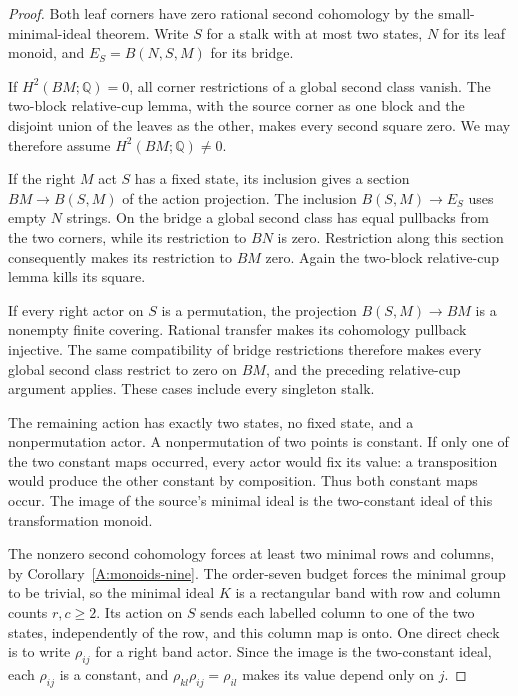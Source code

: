 \begin{proof}
Both leaf corners have zero rational second cohomology
by the small-minimal-ideal theorem.  Write $S$ for a stalk
with at most two states, $N$ for its leaf monoid, and
$E_S=B(N,S,M)$ for its bridge.

If $H^2(BM;\mathbb Q)=0$, all corner restrictions of a
global second class vanish.  The two-block relative-cup
lemma, with the source corner as one block and the
disjoint union of the leaves as the other, makes every
second square zero.  We may therefore assume
$H^2(BM;\mathbb Q)\ne0$.

If the right $M$ act $S$ has a fixed state, its inclusion
gives a section $BM\to B(S,M)$ of the action projection.
The inclusion $B(S,M)\to E_S$ uses empty $N$ strings.
On the bridge a global second class has equal pullbacks
from the two corners, while its restriction to $BN$ is
zero.  Restriction along this section consequently makes
its restriction to $BM$ zero.  Again the two-block
relative-cup lemma kills its square.

If every right actor on $S$ is a permutation, the
projection $B(S,M)\to BM$ is a nonempty finite covering.
Rational transfer makes its cohomology pullback injective.
The same compatibility of bridge restrictions therefore
makes every global second class restrict to zero on
$BM$, and the preceding relative-cup argument applies.
These cases include every singleton stalk.

The remaining action has exactly two states, no fixed
state, and a nonpermutation actor.  A nonpermutation of
two points is constant.  If only one of the two constant
maps occurred, every actor would fix its value: a
transposition would produce the other constant by
composition.  Thus both constant maps occur.  The image
of the source's minimal ideal is the two-constant ideal
of this transformation monoid.

The nonzero second cohomology forces at least two
minimal rows and columns, by
Corollary~\ref{A:monoids-nine}.  The order-seven budget
forces the minimal group to be trivial, so the minimal
ideal $K$ is a rectangular band with row and column
counts $r,c\ge2$.  Its action on $S$ sends each labelled
column to one of the two states, independently of the
row, and this column map is onto.  One direct check is
to write $\rho_{ij}$ for a right band actor.  Since the
image is the two-constant ideal, each $\rho_{ij}$ is a
constant, and
$\rho_{kl}\rho_{ij}=\rho_{il}$ makes its value depend
only on $j$.


\end{proof}
